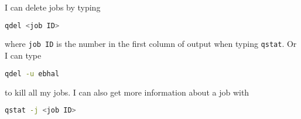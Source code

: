 I can delete jobs by typing

\begin{lstlisting}[belowskip=-0.7cm, language=sh, numbers=none]
qdel <job ID>
\end{lstlisting}

where \texttt{job ID} is the number in the first column of output when typing \texttt{qstat}. Or I can type

\begin{lstlisting}[belowskip=-0.7cm, language=sh, numbers=none]
qdel -u ebhal
\end{lstlisting}

to kill all my jobs. I can also get more information about a job with

\begin{lstlisting}[belowskip=-0.7cm, language=sh, numbers=none]
qstat -j <job ID>
\end{lstlisting}
